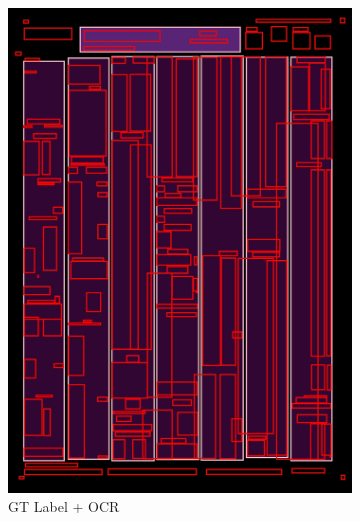 \documentclass[aspectratio=1610]{beamer}
\begin{document}
\begin{frame}
\begin{figure}
\begin{subfigure}{.25\textwidth}
  \includegraphics[width=0.99\linewidth, clip=true, trim = 0mm 0mm 0mm 0mm]{figures/ocr_bbox/zk6UnuL.jpg}
  \caption{GT Label + OCR}
\end{subfigure}%
\begin{subfigure}{.25\textwidth}
  \centering

\end{subfigure}
\end{figure}
\end{frame}
\end{document}
